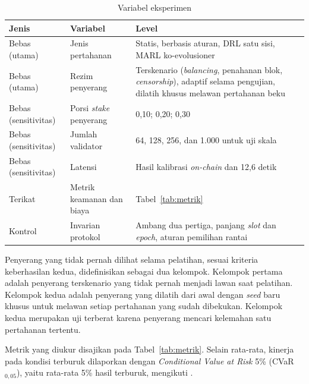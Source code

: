 \begin{table}[htbp]
\centering
\caption{Variabel eksperimen}
\label{tab:variabel}
\small
\begin{tabular}{|p{2.4cm}|p{3.2cm}|p{6.6cm}|}
\hline
\textbf{Jenis} & \textbf{Variabel} & \textbf{Level} \\
\hline
Bebas (utama) & Jenis pertahanan & Statis, berbasis aturan, DRL satu sisi, MARL ko-evolusioner \\
\hline
Bebas (utama) & Rezim penyerang & Terskenario (\textit{balancing}, penahanan blok, \textit{censorship}), adaptif selama pengujian, dilatih khusus melawan pertahanan beku \parencite{wushishi2026coadam} \\
\hline
Bebas (sensitivitas) & Porsi \textit{stake} penyerang & 0,10; 0,20; 0,30 \\
\hline
Bebas (sensitivitas) & Jumlah validator & 64, 128, 256, dan 1.000 untuk uji skala \\
\hline
Bebas (sensitivitas) & Latensi & Hasil kalibrasi \textit{on-chain} dan 12,6 detik \parencite{laneve2025stochastic} \\
\hline
Terikat & Metrik keamanan dan biaya & Tabel~\ref{tab:metrik} \\
\hline
Kontrol & Invarian protokol & Ambang dua pertiga, panjang \textit{slot} dan \textit{epoch}, aturan pemilihan rantai \\
\hline
\end{tabular}
\end{table}

Penyerang yang tidak pernah dilihat selama pelatihan, sesuai kriteria keberhasilan kedua, didefinisikan sebagai dua kelompok. Kelompok pertama adalah penyerang terskenario yang tidak pernah menjadi lawan saat pelatihan. Kelompok kedua adalah penyerang yang dilatih dari awal dengan \textit{seed} baru khusus untuk melawan setiap pertahanan yang sudah dibekukan. Kelompok kedua merupakan uji terberat karena penyerang mencari kelemahan satu pertahanan tertentu.

Metrik yang diukur disajikan pada Tabel~\ref{tab:metrik}. Selain rata-rata, kinerja pada kondisi terburuk dilaporkan dengan \textit{Conditional Value at Risk} 5\% (CVaR$_{0{,}05}$), yaitu rata-rata 5\% hasil terburuk, mengikuti \textcite{wushishi2026coadam}.

